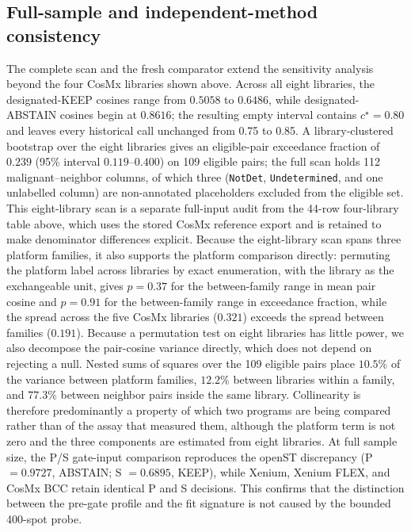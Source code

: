 \subsection{Full-sample and independent-method consistency}
The complete scan and the fresh comparator extend the sensitivity analysis beyond the four CosMx libraries shown above. Across all eight libraries, the designated-KEEP cosines range from \(0.5058\) to \(0.6486\), while designated-ABSTAIN cosines begin at \(0.8616\); the resulting empty interval contains \(c^\star=0.80\) and leaves every historical call unchanged from 0.75 to 0.85. A library-clustered bootstrap over the eight libraries gives an eligible-pair exceedance fraction of \(0.239\) (95\% interval \(0.119\)--\(0.400\)) on 109 eligible pairs; the full scan holds 112 malignant--neighbor columns, of which three (\texttt{NotDet}, \texttt{Undetermined}, and one unlabelled column) are non-annotated placeholders excluded from the eligible set. This eight-library scan is a separate full-input audit from the 44-row four-library table above, which uses the stored CosMx reference export and is retained to make denominator differences explicit. Because the eight-library scan spans three platform families, it also supports the platform comparison directly: permuting the platform label across libraries by exact enumeration, with the library as the exchangeable unit, gives \(p=0.37\) for the between-family range in mean pair cosine and \(p=0.91\) for the between-family range in exceedance fraction, while the spread across the five CosMx libraries (\(0.321\)) exceeds the spread between families (\(0.191\)). Because a permutation test on eight libraries has little power, we also decompose the pair-cosine variance directly, which does not depend on rejecting a null. Nested sums of squares over the 109 eligible pairs place \(10.5\%\) of the variance between platform families, \(12.2\%\) between libraries within a family, and \(77.3\%\) between neighbor pairs inside the same library. Collinearity is therefore predominantly a property of which two programs are being compared rather than of the assay that measured them, although the platform term is not zero and the three components are estimated from eight libraries. At full sample size, the P/S gate-input comparison reproduces the openST discrepancy (P \(=0.9727\), ABSTAIN; S \(=0.6895\), KEEP), while Xenium, Xenium FLEX, and CosMx BCC retain identical P and S decisions. This confirms that the distinction between the pre-gate profile and the fit signature is not caused by the bounded 400-spot probe.

